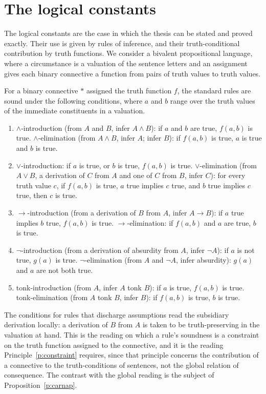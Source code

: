 \documentclass{situationist-preprint}
\begin{document}
\section{The logical constants}\label{s:logic}

The logical constants are the case in which the thesis can be stated and proved exactly. Their use is given by rules of inference, and their truth-conditional contribution by truth functions. We consider a bivalent propositional language, where a circumstance is a valuation of the sentence letters and an assignment gives each binary connective a function from pairs of truth values to truth values.

\begin{definition}\label{d:conds}
For a binary connective $\ast$ assigned the truth function $f$, the standard rules are sound under the following conditions, where $a$ and $b$ range over the truth values of the immediate constituents in a valuation.
\begin{enumerate}[label=(\alph*)]
\item $\wedge$-introduction (from $A$ and $B$, infer $A\wedge B$): if $a$ and $b$ are true, $f(a,b)$ is true. $\wedge$-elimination (from $A \wedge B$, infer $A$; infer $B$): if $f(a,b)$ is true, $a$ is true and $b$ is true.
\item $\vee$-introduction: if $a$ is true, or $b$ is true, $f(a,b)$ is true. $\vee$-elimination (from $A\vee B$, a derivation of $C$ from $A$ and one of $C$ from $B$, infer $C$): for every truth value $c$, if $f(a,b)$ is true, $a$ true implies $c$ true, and $b$ true implies $c$ true, then $c$ is true.
\item $\to$-introduction (from a derivation of $B$ from $A$, infer $A \to B$): if $a$ true implies $b$ true, $f(a,b)$ is true. $\to$-elimination: if $f(a,b)$ and $a$ are true, $b$ is true.
\item $\neg$-introduction (from a derivation of absurdity from $A$, infer $\neg A$): if $a$ is not true, $g(a)$ is true. $\neg$-elimination (from $A$ and $\neg A$, infer absurdity): $g(a)$ and $a$ are not both true.
\item tonk-introduction (from $A$, infer $A$ tonk $B$): if $a$ is true, $f(a,b)$ is true. tonk-elimination (from $A$ tonk $B$, infer $B$): if $f(a,b)$ is true, $b$ is true.
\end{enumerate}
\end{definition}

The conditions for rules that discharge assumptions read the subsidiary derivation locally: a derivation of $B$ from $A$ is taken to be truth-preserving in the valuation at hand. This is the reading on which a rule's soundness is a constraint on the truth function assigned to the connective, and it is the reading Principle~\ref{p:constraint} requires, since that principle concerns the contribution of a connective to the truth-conditions of sentences, not the global relation of consequence. The contrast with the global reading is the subject of Proposition~\ref{p:carnap}.
\end{document}
